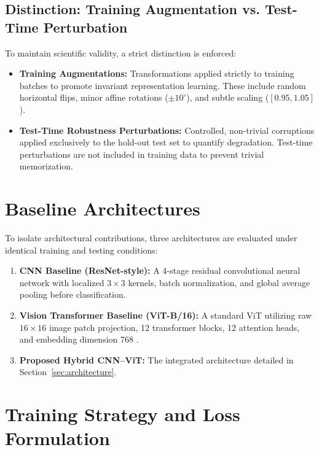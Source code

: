\documentclass[conference]{IEEEtran}
\begin{document}
\subsection{Distinction: Training Augmentation vs. Test-Time Perturbation}
To maintain scientific validity, a strict distinction is enforced:
\begin{itemize}
    \item \textbf{Training Augmentations:} Transformations applied strictly to training batches to promote invariant representation learning. These include random horizontal flips, minor affine rotations ($\pm 10^\circ$), and subtle scaling ($[0.95, 1.05]$).
    \item \textbf{Test-Time Robustness Perturbations:} Controlled, non-trivial corruptions applied exclusively to the hold-out test set to quantify degradation. Test-time perturbations are not included in training data to prevent trivial memorization.
\end{itemize}

\section{Baseline Architectures}
\label{sec:baselines}

To isolate architectural contributions, three architectures are evaluated under identical training and testing conditions:
\begin{enumerate}
    \item \textbf{CNN Baseline (ResNet-style):} A 4-stage residual convolutional neural network with localized $3 \times 3$ kernels, batch normalization, and global average pooling before classification.
    \item \textbf{Vision Transformer Baseline (ViT-B/16):} A standard ViT utilizing raw $16 \times 16$ image patch projection, 12 transformer blocks, 12 attention heads, and embedding dimension 768 \cite{dosovitskiy2020image}.
    \item \textbf{Proposed Hybrid CNN--ViT:} The integrated architecture detailed in Section~\ref{sec:architecture}.
\end{enumerate}

\section{Training Strategy and Loss Formulation}
\label{sec:training}
\end{document}
